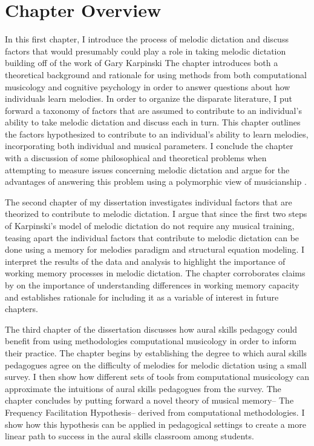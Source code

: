 \documentclass[]{book}
\begin{document}
\hypertarget{chapter-overview}{%
\section{Chapter Overview}\label{chapter-overview}}

In this first chapter, I introduce the process of melodic dictation and discuss factors that would presumably could play a role in taking melodic dictation building off of the work of Gary Karpinski \citep{karpinskiAuralSkillsAcquisition2000, karpinskiModelMusicPerception1990}
The chapter introduces both a theoretical background and rationale for using methods from both computational musicology and cognitive psychology in order to answer questions about how individuals learn melodies.
In order to organize the disparate literature, I put forward a taxonomy of factors that are assumed to contribute to an individual's ability to take melodic dictation and discuss each in turn.
This chapter outlines the factors hypothesized to contribute to an individual's ability to learn melodies, incorporating both individual and musical parameters.
I conclude the chapter with a discussion of some philosophical and theoretical problems when attempting to measure issues concerning melodic dictation and argue for the advantages of answering this problem using a polymorphic view of musicianship \citep{levitinWhatDoesIt2012, peretzNatureMusicBiological2006, bakerExaminingMusicalSophistication2018}.

The second chapter of my dissertation investigates individual factors that are theorized to contribute to melodic dictation.
I argue that since the first two steps of Karpinski's model of melodic dictation do not require any musical training, teasing apart the individual factors that contribute to melodic dictation can be done using a memory for melodies paradigm and structural equation modeling.
I interpret the results of the data and analysis to highlight the importance of working memory processes in melodic dictation.
The chapter corroborates claims by \citet{berzWorkingMemoryMusic1995} on the importance of understanding differences in working memory capacity and establishes rationale for including it as a variable of interest in future chapters.

The third chapter of the dissertation discusses how aural skills pedagogy could benefit from using methodologies computational musicology in order to inform their practice.
The chapter begins by establishing the degree to which aural skills pedagogues agree on the difficulty of melodies for melodic dictation using a small survey.
I then show how different sets of tools from computational musicology can approximate the intuitions of aural skills pedagogues from the survey.
The chapter concludes by putting forward a novel theory of musical memory-- The Frequency Facilitation Hypothesis-- derived from computational methodologies.
I show how this hypothesis can be applied in pedagogical settings to create a more linear path to success in the aural skills classroom among students.
\end{document}
